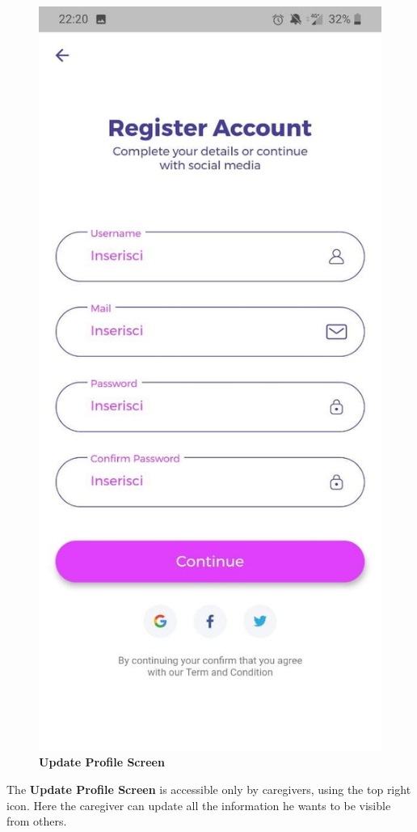 \documentclass[../../dd.tex]{subfiles}
\begin{document}
    \begin{figure}[H]
        \centering
        \includegraphics[height=.6\textheight]{../../assets/screens/register.jpg}
        \caption{\textbf{Update Profile Screen}}\label{fig:figure}
    \end{figure}
    \begin{center}
        The \textbf{Update Profile Screen} is accessible only by caregivers, using the top right icon.
        Here the caregiver can update all the information he wants to be visible from others.
    \end{center}
\end{document}
